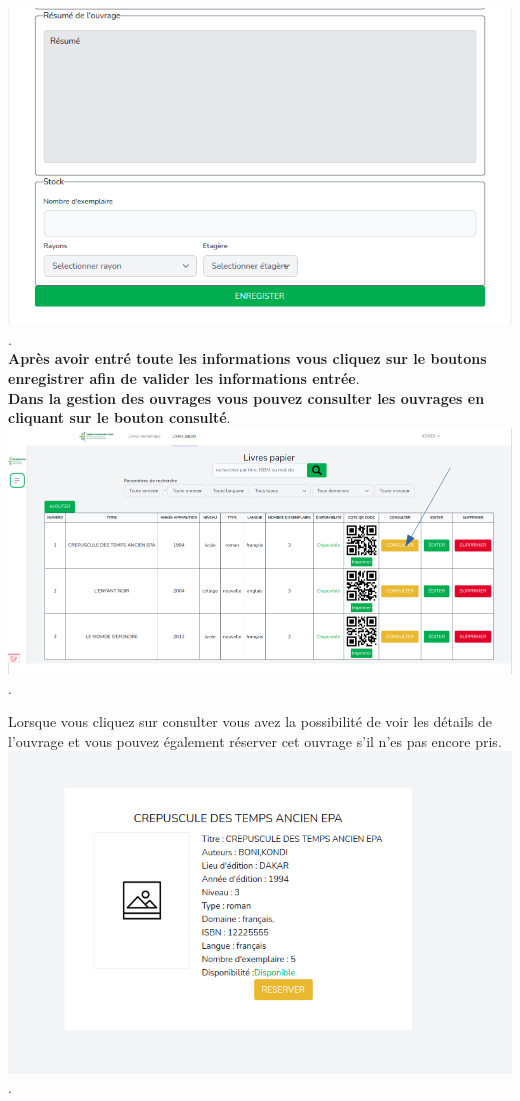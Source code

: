 \documentclass[12pt,a4paper]{article}
\begin{document}
\includegraphics[scale=0.5]{images/ResumeStock.png}.\\

\textbf{Après avoir entré toute les informations vous cliquez sur le boutons enregistrer afin de valider les informations entrée}.\\

\newpage
\textbf{Dans la gestion des ouvrages vous pouvez consulter les ouvrages en cliquant sur le bouton consulté}. \\

\includegraphics[scale=0.5]{images/ConsultationOuvragePhysique.png}.

Lorsque vous cliquez sur consulter vous avez la possibilité de voir les détails de l'ouvrage et vous pouvez également réserver cet ouvrage s'il n'es pas encore pris.\\

\includegraphics[scale=0.5]{images/ResulConsulter.png}.\\
\end{document}
